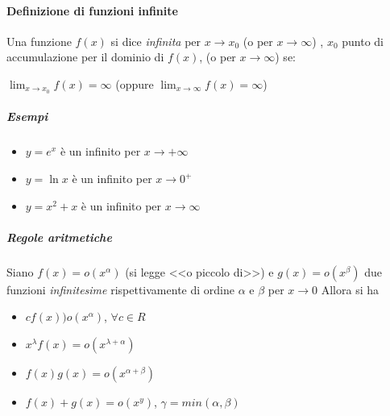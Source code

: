 \paragraph{Definizione di funzioni infinite}
Una funzione $f(x)$ si dice \textit{infinita} per $x\to x_0$ (o per $x \to \infty$) , $x_0$ punto di accumulazione per il dominio di $f(x)$, (o per $x\to \infty$) se:
\begin {center}
	$\lim_{x\to x_0}f(x)=\infty$ (oppure $\lim_{x\to \infty}f(x)=\infty$)
\end{center}
\subparagraph{Esempi}
\begin{itemize}
	\item $y=e^x$ è un infinito per $x\to +\infty$
	\item $y=\ln{x}$ è un infinito per $x\to 0^+$
	\item $y=x^2+x$ è un infinito per $x\to \infty$
\end{itemize}
\subparagraph{Regole aritmetiche}
Siano $f(x)=o(x^\alpha)$ (si legge <<o piccolo di>>) e $g(x)=o(x^\beta)$ due funzioni \textit{infinitesime} rispettivamente di ordine $\alpha$ e $\beta$ per $x \to 0$ Allora si ha
\begin{itemize}
	\item $cf(x))o(x^\alpha)$, $\forall c \in R$
	\item $x^\lambda f(x)=o(x^{\lambda+\alpha})$
	\item $f(x)g(x)=o(x^{\alpha+\beta})$
	\item $f(x)+g(x)=o(x^y)$, $\gamma=min(\alpha,\beta)$
\end{itemize}
